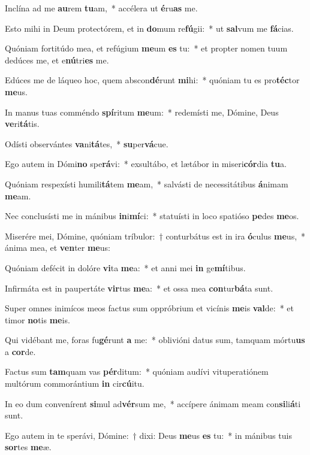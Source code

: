 \item Inclína ad me \textbf{au}rem \textbf{tu}am,~* accélera ut \textbf{é}ru\textbf{as} me.
\item Esto mihi in Deum protectórem, et in \textbf{do}mum re\textbf{fú}gii:~* ut \textbf{sal}vum me \textbf{fá}cias.
\item Quóniam fortitúdo mea, et refúgium \textbf{me}um \textbf{es} tu:~* et propter nomen tuum dedúces me, et e\textbf{nú}tri\textbf{es} me.
\item Edúces me de láqueo hoc, quem abscon\textbf{dé}runt \textbf{mi}hi:~* quóniam tu es pro\textbf{téc}tor \textbf{me}us.
\item In manus tuas comméndo \textbf{spí}ritum \textbf{me}um:~* redemísti me, Dómine, Deus \textbf{ve}ri\textbf{tá}tis.
\item Odísti observántes \textbf{va}ni\textbf{tá}tes,~* \textbf{su}per\textbf{vá}cue.
\item Ego autem in Dómi\textbf{no} spe\textbf{rá}vi:~* exsultábo, et lætábor in miseri\textbf{cór}dia \textbf{tu}a.
\item Quóniam respexísti humili\textbf{tá}tem \textbf{me}am,~* salvásti de necessitátibus \textbf{á}nimam \textbf{me}am.
\item Nec conclusísti me in mánibus \textbf{in}i\textbf{mí}ci:~* statuísti in loco spatióso \textbf{pe}des \textbf{me}os.
\item Miserére mei, Dómine, quóniam tríbulor:~† conturbátus est in ira \textbf{ó}culus \textbf{me}us,~* ánima mea, et \textbf{ven}ter \textbf{me}us:
\item Quóniam defécit in dolóre \textbf{vi}ta \textbf{me}a:~* et anni mei \textbf{in} ge\textbf{mí}tibus.
\item Infirmáta est in paupertáte \textbf{vir}tus \textbf{me}a:~* et ossa mea \textbf{con}tur\textbf{bá}ta sunt.
\item Super omnes inimícos meos factus sum oppróbrium et vicínis \textbf{me}is \textbf{val}de:~* et timor \textbf{no}tis \textbf{me}is.
\item Qui vidébant me, foras fu\textbf{gé}runt \textbf{a} me:~* oblivióni datus sum, tamquam mórtu\textbf{us} a \textbf{cor}de.
\item Factus sum \textbf{tam}quam vas \textbf{pér}ditum:~* quóniam audívi vituperatiónem multórum commorántium \textbf{in} cir\textbf{cú}itu.
\item In eo dum convenírent \textbf{si}mul ad\textbf{vér}sum me,~* accípere ánimam meam con\textbf{si}li\textbf{á}ti sunt.
\item Ego autem in te sperávi, Dómine:~† dixi: Deus \textbf{me}us \textbf{es} tu:~* in mánibus tuis \textbf{sor}tes \textbf{me}æ.
